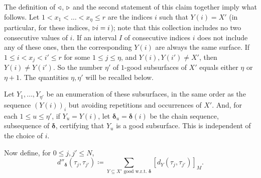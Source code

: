 The definition of $\triangleleft$, $\triangleright$ and the second statement of this claim together imply what follows. Let $1<x_1<\ldots<x_\eta\leq r$ are the indices $i$ such that $Y(i)=X'$ (in particular, for these indices, $\triangleright i=i$); note that this collection includes no two consecutive values of $i$. If an interval $I$ of consecutive indices $i$ does not include any of these ones, then the corresponding $Y(i)$ are always the same surface. If $1\leq i< x_j < i' \leq r$ for some $1\leq j\leq\eta$, and $Y(i),Y(i')\not=X'$, then $Y(i)\not= Y(i')$. So the number $\eta'$ of $1$-good subsurfaces of $X'$ equals either $\eta$ or $\eta+1$. The quantities $\eta,\eta'$ will be recalled below.

Let $Y_1,\ldots,Y_{\eta'}$ be an enumeration of these subsurfaces, in the same order as the sequence $\left(Y(i)\right)_i$ but avoiding repetitions and occurrences of $X'$. And, for each $1\leq u\leq \eta'$, if $Y_u=Y(i)$, let $\bm\delta_u=\bm\delta(i)$ be the chain sequence, subsequence of $\bm\delta$, certifying that $Y_u$ is a good subsurface. This is independent of the choice of $i$.

Now define, for $0\leq j,j'\leq N$,
$$d''_{\bm\delta}(\tau_j,\tau_{j'})\coloneqq \sum_{Y \subseteq X' \text{ good w.r.t. } \bm\delta} [d_Y(\tau_j,\tau_{j'})]_M.$$

